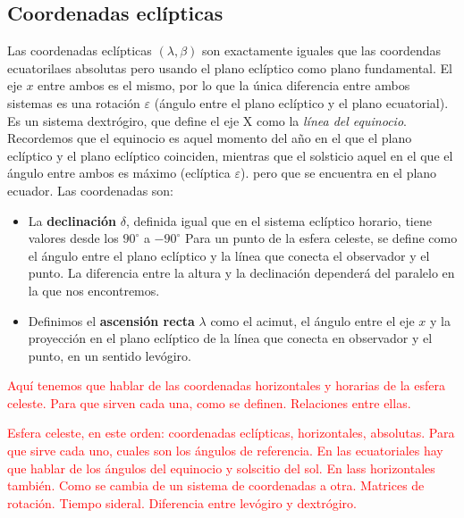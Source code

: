 \subsection{Coordenadas eclípticas}

Las coordenadas eclípticas $(\lambda,\beta)$ son exactamente iguales que las coordendas ecuatorilaes absolutas pero usando el plano eclíptico como plano fundamental. El eje $x$ entre ambos es el mismo, por lo que la única diferencia entre ambos sistemas es una rotación $\varepsilon$ (ángulo entre el plano eclíptico y el plano ecuatorial). Es un sistema dextrógiro, que define el eje X como la \textit{línea del equinocio}. Recordemos que el equinocio es aquel momento del año en el que el plano eclíptico y el plano eclíptico coinciden, mientras que el solsticio aquel en el que el ángulo entre ambos es máximo (eclíptica $\varepsilon$). pero que se encuentra en el plano ecuador. Las coordenadas son:

\begin{itemize}
	\item La \textbf{declinación} $\delta$, definida igual que en el sistema eclíptico horario, tiene valores desde los $90^\circ$ a $-90^\circ$ Para un punto de la esfera celeste, se define como el ángulo entre el plano eclíptico y la línea que conecta el observador y el punto. La diferencia entre la altura y la declinación dependerá del paralelo en la que nos encontremos. 
	\item Definimos el \textbf{ascensión recta} $\lambda$ como el acimut, el ángulo entre el eje $x$ y la proyección en el plano eclíptico de la línea que conecta en observador y el punto, en un sentido levógiro. 
\end{itemize}


\begin{Anotacion}
	\textcolor{red}{Aquí tenemos que hablar de las coordenadas horizontales y horarias de la esfera celeste. Para que sirven cada una, como se definen. Relaciones entre ellas.}
\end{Anotacion}	



\begin{Anotacion}
	\textcolor{red}{Esfera celeste, en este orden: coordenadas eclípticas, horizontales, absolutas. Para que sirve cada uno, cuales son los ángulos de referencia. En las ecuatoriales hay que hablar de los ángulos del equinocio y solscitio del sol. En lass horizontales también. Como se cambia de un sistema de coordenadas a otra. Matrices de rotación. Tiempo sideral. Diferencia entre levógiro y dextrógiro. }
\end{Anotacion}	

